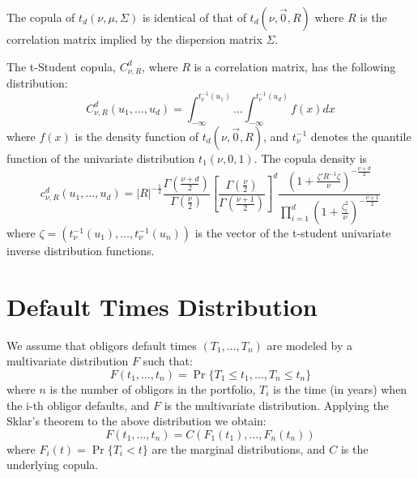 \documentclass[11pt,fleqn]{book} %
\begin{document}
\begin{proposition}
The copula of $t_d(\nu,\mu,\Sigma)$ is identical of that of $t_d(\nu,\vec{0},R)$
where $R$ is the correlation matrix implied by the dispersion matrix $\Sigma$.
\end{proposition}

\begin{proposition}
The t-Student copula, $C_{\nu,R}^d$, where $R$ is a correlation matrix,
has the following distribution:
\begin{displaymath}
C_{\nu,R}^d(u_1, \dots, u_d) = 
\int_{-\infty}^{t_\nu^{-1}(u_1)} \dots \int_{-\infty}^{t_\nu^{-1}(u_d)} f(x) dx
\end{displaymath}
where $f(x)$ is the density function of $t_d(\nu,\vec{0},R)$, and $t_{\nu}^{-1}$ denotes the 
quantile function of the univariate distribution $t_1(\nu,0,1)$. 
The copula density is
\begin{displaymath}
\label{eq:density}
c_{\nu,R}^d(u_1,\dots,u_d) = %
|R|^{-\frac{1}{2}} 
\displaystyle\frac{\Gamma{\left(\frac{\nu+d}{2}\right)}}{\Gamma{\left(\frac{\nu}{2}\right)}}
\displaystyle\left[ \frac{\Gamma{\left(\frac{\nu}{2}\right)}}{\Gamma{\left(\frac{\nu+1}{2}\right)}} \right]^d
\frac{\displaystyle\left( 1+\frac{\zeta' R^{-1} \zeta}{\nu}\right)^{-\frac{\nu+d}{2}}}{\displaystyle\prod_{i=1}^d \left( 1+\frac{\zeta_i^2}{\nu} \right)^{-\frac{\nu+1}{2}}}
\end{displaymath}
\noindent
where $\zeta=(t_\nu^{-1}(u_1), \dots, t_\nu^{-1}(u_n))$ is the vector of the t-student 
univariate inverse distribution functions.
\end{proposition}


\section{Default Times Distribution}

We assume that obligors default times $(T_1, \dots, T_n)$ are modeled 
by a multivariate distribution $F$ such that:
\begin{displaymath}
F(t_1, \dots, t_n) = \Pr \{T_1 \le t_1, \dots, T_n \le t_n\}
\end{displaymath}
where $n$ is the number of obligors in the portfolio, $T_i$ is the time 
(in years) when the i-th obligor defaults, and $F$ is the multivariate
distribution. Applying the Sklar's theorem to the above distribution 
we obtain:
\begin{displaymath}
F(t_1, \dots, t_n) = C\left(F_1(t_1), \dots, F_n(t_n)\right) 
\end{displaymath}
where $F_i(t) = \Pr\{T_i < t\}$ are the marginal distributions, 
and $C$ is the underlying copula.
\end{document}
